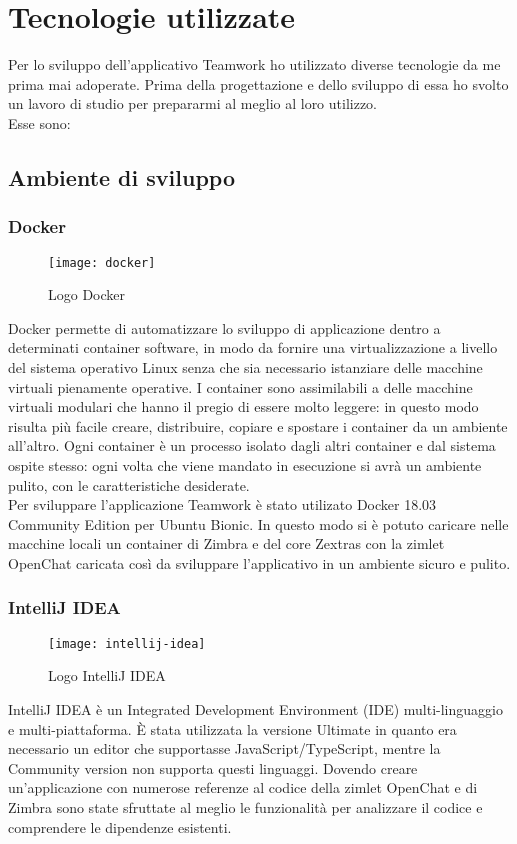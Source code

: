 
\chapter{Tecnologie utilizzate}\label{chap:tec}
Per lo sviluppo dell'applicativo Teamwork ho utilizzato diverse tecnologie da 
me prima mai adoperate. Prima della progettazione e dello sviluppo di essa ho 
svolto un lavoro di studio per prepararmi al meglio al loro utilizzo. \\
Esse sono:


\section{Ambiente di sviluppo}
\subsection{Docker}
	\begin{figure}[H] 
		\centering
		\texttt{[image: docker]}
		\caption{Logo Docker}
	\end{figure}
Docker permette di automatizzare lo sviluppo di applicazione dentro a 
determinati container software, 
in modo da fornire una virtualizzazione a livello del sistema operativo Linux
senza che sia necessario istanziare delle macchine virtuali pienamente 
operative.
I container sono assimilabili a delle macchine virtuali modulari che hanno il 
pregio di essere molto 
leggere: in questo modo risulta più facile  creare, distribuire, copiare e spostare 
i container da un 
ambiente all'altro.
Ogni container è un processo isolato dagli altri container e dal sistema ospite stesso:  ogni volta che 
viene mandato in esecuzione si avrà un ambiente pulito, con le caratteristiche desiderate. \\
Per sviluppare l'applicazione Teamwork è stato utilizato Docker 18.03 Community Edition per Ubuntu 
Bionic. In questo modo si è potuto caricare nelle macchine locali un container di Zimbra e del core 
Zextras con la zimlet OpenChat caricata così da sviluppare l'applicativo in un ambiente sicuro e pulito.

\subsection{IntelliJ IDEA} \label{subsec:IntelliJ}
	\begin{figure}[H] 
		\centering
		\texttt{[image: intellij-idea]}
		\caption{Logo IntelliJ IDEA}
	\end{figure}
IntelliJ IDEA è un Integrated Development Environment (IDE) multi-linguaggio e 
multi-piattaforma. 
È stata utilizzata la versione Ultimate in quanto era necessario un editor che 
supportasse  
JavaScript/TypeScript, mentre la Community version non supporta questi 
linguaggi. 
Dovendo creare un'applicazione con numerose referenze al codice della zimlet 
OpenChat e di Zimbra 
sono state sfruttate al meglio le funzionalità per analizzare il codice e 
comprendere le 
dipendenze esistenti.

